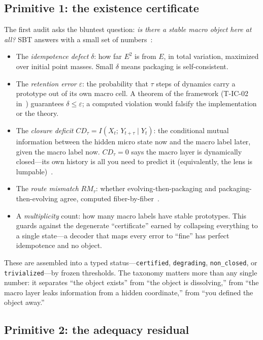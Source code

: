 \documentclass[11pt]{article}
\theoremstyle{definition}
\begin{document}
\subsection{Primitive 1: the existence certificate}
\label{sec:sbt-existence}

The first audit asks the bluntest question: \emph{is there a stable macro object here at all?} SBT answers with a small set of numbers~\cite{sbt-f1,sbt-f3,sbt-xor}:

\begin{itemize}
\item The \emph{idempotence defect} $\delta$: how far $E^2$ is from $E$, in total variation, maximized over initial point masses. Small $\delta$ means packaging is self-consistent.
\item The \emph{retention error} $\varepsilon$: the probability that $\tau$ steps of dynamics carry a prototype out of its own macro cell. A theorem of the framework (T-IC-02 in~\cite{sbt-f1}) guarantees $\delta \le \varepsilon$; a computed violation would falsify the implementation or the theory.
\item The \emph{closure deficit} $CD_\tau = I(X_t;\, Y_{t+\tau} \mid Y_t)$: the conditional mutual information between the hidden micro state now and the macro label later, given the macro label now. $CD_\tau = 0$ says the macro layer is dynamically closed---its own history is all you need to predict it (equivalently, the lens is lumpable)~\cite{sbt-f3,sbt-ng,sbt-cast}.
\item The \emph{route mismatch} $RM_\tau$: whether evolving-then-packaging and packaging-then-evolving agree, computed fiber-by-fiber~\cite{sbt-xor}.
\item A \emph{multiplicity} count: how many macro labels have stable prototypes. This guards against the degenerate ``certificate'' earned by collapsing everything to a single state---a decoder that maps every error to ``fine'' has perfect idempotence and no object.
\end{itemize}

These are assembled into a typed status---\texttt{certified}, \texttt{degrading}, \texttt{non\_closed}, or \texttt{trivialized}---by frozen thresholds. The taxonomy matters more than any single number: it separates ``the object exists'' from ``the object is dissolving,'' from ``the macro layer leaks information from a hidden coordinate,'' from ``you defined the object away.''

\subsection{Primitive 2: the adequacy residual}
\label{sec:sbt-xi}
\end{document}
